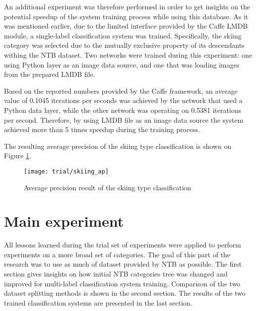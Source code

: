     An additional experiment was therefore performed in order to get insights on the potential speedup of the system training process while using this database. As it was mentioned earlier, due to the limited interface provided by the Caffe LMDB module, a single-label classification system was trained. Specifically, the skiing category was selected due to the mutually exclusive property of its descendants withing the NTB dataset. Two networks were trained during this experiment: one using Python layer as an image data source, and one that was loading images from the prepared LMDB file.
    
    Based on the reported numbers provided by the Caffe framework, an average value of 0.1045 iterations per seconds was achieved by the network that used a Python data layer, while the other network was operating on 0.5381 iterations per second. Therefore, by using LMDB file as an image data source the system achieved more than 5 times speedup during the training process. 
    
    The resulting average precision of the skiing type classification is shown on Figure \ref{fig:trial-skiing-ap}.
    
    \begin{figure}[H]
        \centering
        \texttt{[image: trial/skiing\_ap]}
        \caption{Average precision result of the skiing type classification}
        \label{fig:trial-skiing-ap}
    \end{figure}
    

\section{Main experiment}
All lessons learned during the trial set of experiments were applied to perform experiments on a more broad set of categories. The goal of this part of the research was to use as much of dataset provided by NTB as possible. The first section gives insights on how initial NTB categories tree was changed and improved for multi-label classification system training. Comparison of the two dataset splitting methods is shown in the second section. The results of the two trained classification systems are presented in the last section.

